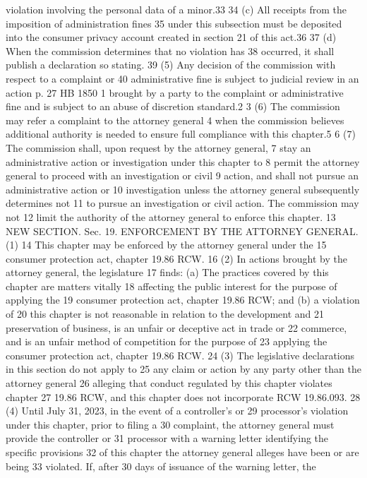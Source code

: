 violation involving the personal data of a minor.33
34 (c) All receipts from the imposition of administration fines
35 under this subsection must be deposited into the consumer privacy
account created in section 21 of this act.36
37 (d) When the commission determines that no violation has
38 occurred, it shall publish a declaration so stating.
39 (5) Any decision of the commission with respect to a complaint or
40 administrative fine is subject to judicial review in an action
p. 27 HB 1850
1 brought by a party to the complaint or administrative fine and is
subject to an abuse of discretion standard.2
3 (6) The commission may refer a complaint to the attorney general
4 when the commission believes additional authority is needed to ensure
full compliance with this chapter.5
6 (7) The commission shall, upon request by the attorney general,
7 stay an administrative action or investigation under this chapter to
8 permit the attorney general to proceed with an investigation or civil
9 action, and shall not pursue an administrative action or
10 investigation unless the attorney general subsequently determines not
11 to pursue an investigation or civil action. The commission may not
12 limit the authority of the attorney general to enforce this chapter.
13 NEW SECTION. Sec. 19. ENFORCEMENT BY THE ATTORNEY GENERAL. (1)
14 This chapter may be enforced by the attorney general under the
15 consumer protection act, chapter 19.86 RCW.
16 (2) In actions brought by the attorney general, the legislature
17 finds: (a) The practices covered by this chapter are matters vitally
18 affecting the public interest for the purpose of applying the
19 consumer protection act, chapter 19.86 RCW; and (b) a violation of
20 this chapter is not reasonable in relation to the development and
21 preservation of business, is an unfair or deceptive act in trade or
22 commerce, and is an unfair method of competition for the purpose of
23 applying the consumer protection act, chapter 19.86 RCW.
24 (3) The legislative declarations in this section do not apply to
25 any claim or action by any party other than the attorney general
26 alleging that conduct regulated by this chapter violates chapter
27 19.86 RCW, and this chapter does not incorporate RCW 19.86.093.
28 (4) Until July 31, 2023, in the event of a controller's or
29 processor's violation under this chapter, prior to filing a
30 complaint, the attorney general must provide the controller or
31 processor with a warning letter identifying the specific provisions
32 of this chapter the attorney general alleges have been or are being
33 violated. If, after 30 days of issuance of the warning letter, the
